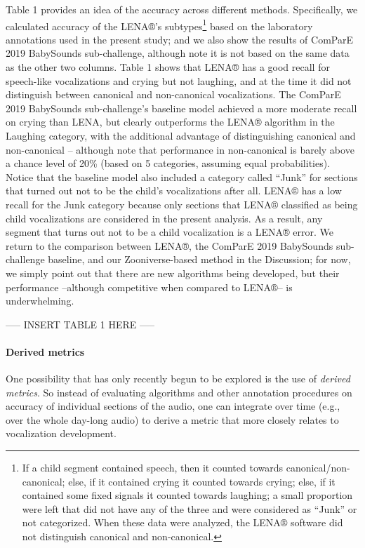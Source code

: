 \documentclass[english,,man]{apa6}
\begin{document}
Table 1 provides an idea of the accuracy across different methods. Specifically, we calculated accuracy of the LENA®'s subtypes\footnote{If a child segment contained speech, then it counted towards canonical/non-canonical; else, if it contained crying it counted towards crying; else, if it contained some fixed signals it counted towards laughing; a small proportion were left that did not have any of the three and were considered as \enquote{Junk} or not categorized. When these data were analyzed, the LENA® software did not distinguish canonical and non-canonical.} based on the laboratory annotations used in the present study; and we also show the results of ComParE 2019 BabySounds sub-challenge, although note it is not based on the same data as the other two columns. Table 1 shows that LENA® has a good recall for speech-like vocalizations and crying but not laughing, and at the time it did not distinguish between canonical and non-canonical vocalizations. The ComParE 2019 BabySounds sub-challenge's baseline model achieved a more moderate recall on crying than LENA, but clearly outperforms the LENA® algorithm in the Laughing category, with the additional advantage of distinguishing canonical and non-canonical -- although note that performance in non-canonical is barely above a chance level of 20\% (based on 5 categories, assuming equal probabilities). Notice that the baseline model also included a category called \enquote{Junk} for sections that turned out not to be the child's vocalizations after all. LENA® has a low recall for the Junk category because only sections that LENA® classified as being child vocalizations are considered in the present analysis. As a result, any segment that turns out not to be a child vocalization is a LENA® error. We return to the comparison between LENA®, the ComParE 2019 BabySounds sub-challenge baseline, and our Zooniverse-based method in the Discussion; for now, we simply point out that there are new algorithms being developed, but their performance --although competitive when compared to LENA®-- is underwhelming.

----- INSERT TABLE 1 HERE -----

\hypertarget{derived-metrics}{%
\paragraph{Derived metrics}\label{derived-metrics}}

One possibility that has only recently begun to be explored is the use of \emph{derived metrics}. So instead of evaluating algorithms and other annotation procedures on accuracy of individual sections of the audio, one can integrate over time (e.g., over the whole day-long audio) to derive a metric that more closely relates to vocalization development.
\end{document}
